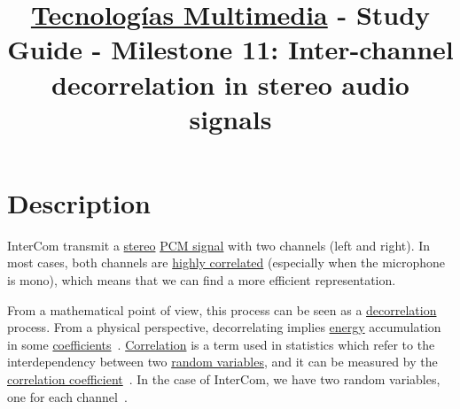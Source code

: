 \title{\href{https://www.ual.es/estudios/grados/presentacion/plandeestudios/asignatura/4015/40154321?idioma=zh_CN}{Tecnologías Multimedia} - Study Guide - Milestone 11: Inter-channel decorrelation in stereo audio signals}

\maketitle

\section{Description}

InterCom transmit
a \href{https://en.wikipedia.org/wiki/Stereophonic_sound}{stereo}
\href{https://en.wikipedia.org/wiki/Pulse-code_modulation}{PCM
signal} with two channels (left and right). In most cases, both
channels
are \href{https://en.wikipedia.org/wiki/Binaural_recording}{highly
correlated} (especially when the microphone is mono), which means that
we can find a more efficient representation.

From a mathematical point of view, this process can be seen as a
\href{https://en.wikipedia.org/wiki/Decorrelation}{decorrelation}
process. From a physical perspective, decorrelating implies \href{https://en.wikipedia.org/wiki/Energy_(signal_processing)}{energy}
accumulation in some
\href{https://web.stanford.edu/class/ee398a/handouts/lectures/07-TransformCoding.pdf}{coefficients}~\cite{sayood2017introduction}. \href{https://en.wikipedia.org/wiki/Correlation_and_dependence}{Correlation}
is a term used in statistics which refer to the interdependency
between
two \href{https://en.wikipedia.org/wiki/Random_variable}{random
variables}, and it can be measured by the
\href{https://www.mathsisfun.com/data/correlation.html}{correlation
  coefficient}~\cite{thinkstats}. In the case of InterCom, we have two
  random variables, one for each channel~\cite{bosi2003intro}.

